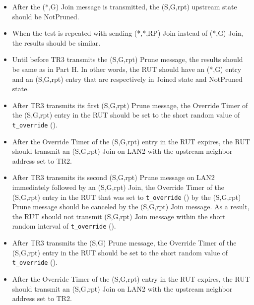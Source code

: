 \documentclass[11pt]{report}
\begin{document}
\begin{itemize}

  \item After the (*,G) Join message is transmitted, the (S,G,rpt) upstream
  state should be NotPruned.

  \item When the test is repeated with sending (*,*,RP) Join instead of (*,G)
  Join, the results should be similar.

\end{itemize}


\begin{itemize}

  \item Until before TR3 transmits the (S,G,rpt) Prune message, the results
  should be same as in Part H. In other words, the RUT should have an (*,G)
  entry and an (S,G,rpt) entry that are respectively in Joined state and
  NotPruned state.

  \item After TR3 transmits its first (S,G,rpt) Prune message, the Override
  Timer of the (S,G,rpt) entry in the RUT should be set to the short random
  value of \verb=t_override= ({\PimsmTOverride}).

  \item After the Override Timer of the (S,G,rpt) entry in the RUT expires,
  the RUT should transmit an (S,G,rpt) Join on LAN2 with the upstream neighbor
  address set to TR2.

  \item After TR3 transmits its second (S,G,rpt) Prune message on LAN2
  immediately followed by an (S,G,rpt) Join, the Override Timer of the
  (S,G,rpt) entry in the RUT that was set to \verb=t_override=
  ({\PimsmTOverride}) by the (S,G,rpt) Prune message should be canceled by the
  (S,G,rpt) Join message. As a result, the RUT should not transmit (S,G,rpt)
  Join message within the short random interval of \verb=t_override=
  ({\PimsmTOverride}).

  \item After TR3 transmits the (S,G) Prune message, the Override
  Timer of the (S,G,rpt) entry in the RUT should be set to the short random
  value of \verb=t_override= ({\PimsmTOverride}).

  \item After the Override Timer of the (S,G,rpt) entry in the RUT expires,
  the RUT should transmit an (S,G,rpt) Join on LAN2 with the upstream neighbor
  address set to TR2.


\end{itemize}
\end{document}
